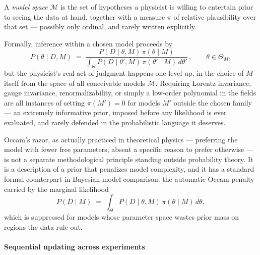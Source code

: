 \begin{definition}
A \emph{model space} $\mathcal{M}$ is the set of hypotheses a physicist is
    willing to entertain prior to seeing the data at hand, together with a
    measure $\pi$ of relative plausibility over that set --- possibly only
    ordinal, and rarely written explicitly.
\end{definition}

Formally, inference within a chosen model proceeds by
\begin{equation}
P(\theta \mid D, M) \;=\; \frac{P(D \mid \theta, M)\,\pi(\theta \mid M)}
    {\displaystyle\int_{\Theta} P(D \mid \theta', M)\,\pi(\theta' \mid M)\, d\theta'}
    \,, \qquad \theta \in \Theta_M,
\end{equation}
but the physicist's real act of judgment happens one level up, in the choice of
$M$ itself from the space of all conceivable models $\mathcal{M}$. Requiring
Lorentz invariance, gauge invariance, renormalizability, or simply a low-order
polynomial in the fields are all instances of setting $\pi(M') = 0$ for models
$M'$ outside the chosen family --- an extremely informative prior, imposed
before any likelihood is ever evaluated, and rarely defended in the
probabilistic language it deserves.

\begin{remark}
Occam's razor, as actually practiced in theoretical physics --- preferring the
    model with fewer free parameters, absent a specific reason to prefer
    otherwise --- is not a separate methodological principle standing outside
    probability theory. It is a description of a prior that penalizes model
    complexity, and it has a standard formal counterpart in Bayesian model
    comparison: the automatic Occam penalty carried by the marginal likelihood
\begin{equation}
P(D \mid M) \;=\; \int_{\Theta} P(D \mid \theta, M)\,\pi(\theta \mid M)\, d\theta,
\end{equation}
which is suppressed for models whose parameter space wastes prior mass on
    regions the data rule out.
\end{remark}

\paragraph{Sequential updating across experiments}

